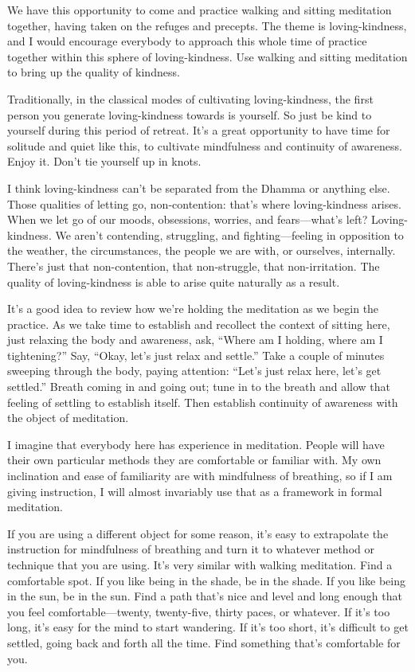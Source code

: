 We have this opportunity to come and practice walking and sitting
meditation together, having taken on the refuges and precepts. The theme
is loving-kindness, and I would encourage everybody to approach this
whole time of practice together within this sphere of loving-kindness.
Use walking and sitting meditation to bring up the quality of kindness.

Traditionally, in the classical modes of cultivating loving-kindness,
the first person you generate loving-kindness towards is yourself. So
just be kind to yourself during this period of retreat. It’s a great
opportunity to have time for solitude and quiet like this, to cultivate
mindfulness and continuity of awareness. Enjoy it. Don’t tie yourself up
in knots.

I think loving-kindness can’t be separated from the Dhamma or anything
else. Those qualities of letting go, non-contention: that’s where
loving-kindness arises. When we let go of our moods, obsessions,
worries, and fears—what’s left? Loving-kindness. We aren’t contending,
struggling, and fighting—feeling in opposition to the weather, the
circumstances, the people we are with, or ourselves, internally. There’s
just that non-contention, that non-struggle, that non-irritation. The
quality of loving-kindness is able to arise quite naturally as a result.

It’s a good idea to review how we’re holding the meditation as we begin
the practice. As we take time to establish and recollect the context of
sitting here, just relaxing the body and awareness, ask, “Where am I
holding, where am I tightening?” Say, “Okay, let’s just relax and
settle.” Take a couple of minutes sweeping through the body, paying
attention: “Let’s just relax here, let’s get settled.” Breath coming in
and going out; tune in to the breath and allow that feeling of settling
to establish itself. Then establish continuity of awareness with the
object of meditation.

I imagine that everybody here has experience in meditation. People will
have their own particular methods they are comfortable or familiar with.
My own inclination and ease of familiarity are with mindfulness of
breathing, so if I am giving instruction, I will almost invariably use
that as a framework in formal meditation.

If you are using a different object for some reason, it’s easy to
extrapolate the instruction for mindfulness of breathing and turn it to
whatever method or technique that you are using. It’s very similar with
walking meditation. Find a comfortable spot. If you like being in the
shade, be in the shade. If you like being in the sun, be in the sun.
Find a path that’s nice and level and long enough that you feel
comfortable—twenty, twenty-five, thirty paces, or whatever. If it’s too
long, it’s easy for the mind to start wandering. If it’s too short, it’s
difficult to get settled, going back and forth all the time. Find
something that’s comfortable for you.

